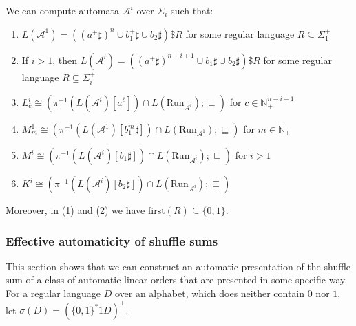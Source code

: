 \documentclass[envcountsame]{llncs}
\newcommand{\A}{\mathcal A}
\newcommand{\first}{\mathrm{first}}
\newcommand{\N}{\mathbb N}
\newcommand{\Run}{\mathrm{Run}}
\begin{document}
\begin{proposition}\label{prop:lo_automaticity} We can compute automata $\A^i$ 
over $\Sigma_i$ such that:
\begin{enumerate}[(1)]
\item $L(\A^1) = ( (a^+\sharp)^n \cup b_1^+\sharp \cup b_2\sharp)\$ R$ for
  some regular language $R \subseteq \Sigma_1^+$
\item  If $i>1$, then $L(\A^i) = ( (a^+\sharp)^{n-i+1} \cup b_1 \sharp \cup b_2\sharp)\$ R$ 
for some regular language $R \subseteq \Sigma_i^+$
\item $L^i_{\overline{c}}\cong (\pi^{-1}(L(\A^i)[\overline{a}^{\overline{c}}])
     \cap L(\Run_{\A^i}); \sqsubseteq)$ for $\overline{c}\in \N^{n-i+1}_+$
\item $M^1_m\cong (\pi^{-1}(L(\A^1)[b_1^m \sharp])\cap L(\Run_{\A^1});\sqsubseteq)$ for $m\in \N_+$
\item  $M^i \cong (\pi^{-1}(L(\A^i)[b_1\sharp]) \cap L(\Run_{\A^i});\sqsubseteq)$ for $i>1$
\item $K^i \cong (\pi^{-1}(L(\A^i)[b_2\sharp])\cap L(\Run_{\A^i});\sqsubseteq)$
\end{enumerate}
Moreover, in (1) and (2) we have $\first(R) \subseteq \{0,1\}$. 
\end{proposition}

\subsubsection{Effective automaticity of shuffle sums} 

This section shows that we can construct an automatic presentation of
the shuffle sum of a class of automatic linear orders that are
presented in some specific way. For a regular language $D$ over an
alphabet, which does neither contain $0$ nor $1$, let $\sigma(D) =
(\{0,1\}^* 1 D)^+$.
\end{document}
